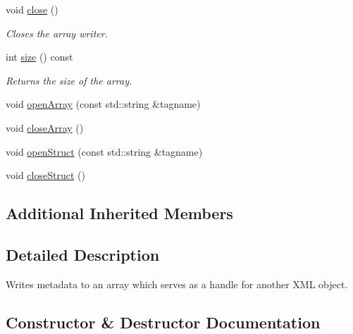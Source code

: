 \begin{DoxyCompactItemize}
\item 
void \mbox{\hyperlink{classADATXML_1_1XMLArrayWriter_a89774ac16fd8636da94745ccba7add0a}{close}} ()
\begin{DoxyCompactList}\small\item\em Closes the array writer. \end{DoxyCompactList}\item 
int \mbox{\hyperlink{classADATXML_1_1XMLArrayWriter_a152ffb3695b1f644614a7ca7ca86efa0}{size}} () const
\begin{DoxyCompactList}\small\item\em Returns the size of the array. \end{DoxyCompactList}\item 
void \mbox{\hyperlink{classADATXML_1_1XMLArrayWriter_aae20d7fa7fe499da36f54ae08b64860e}{open\+Array}} (const std\+::string \&tagname)
\item 
void \mbox{\hyperlink{classADATXML_1_1XMLArrayWriter_a5d6b79a0e8add658220f21e5fc138230}{close\+Array}} ()
\item 
void \mbox{\hyperlink{classADATXML_1_1XMLArrayWriter_af1602cb14d54aa8e42442f2784c00e22}{open\+Struct}} (const std\+::string \&tagname)
\item 
void \mbox{\hyperlink{classADATXML_1_1XMLArrayWriter_a5a849f8851bce99654c44dc08b1fe486}{close\+Struct}} ()
\end{DoxyCompactItemize}
\subsection*{Additional Inherited Members}


\subsection{Detailed Description}
Writes metadata to an array which serves as a handle for another X\+ML object. 

\subsection{Constructor \& Destructor Documentation}
\mbox{\label{classADATXML_1_1XMLArrayWriter_a51816af0342b997945b0d21e4ba30c5d}} 
